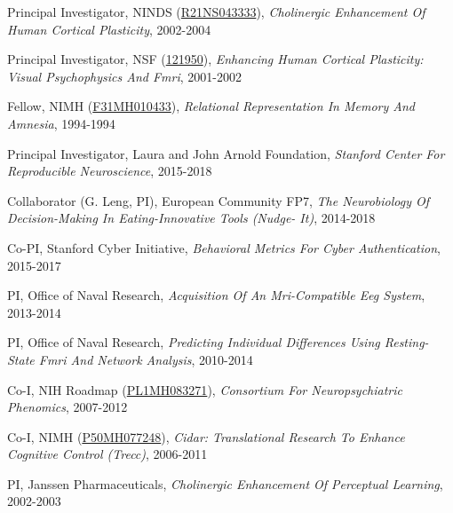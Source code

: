\documentclass[10pt, letterpaper]{article}
\begin{document}
Principal Investigator, NINDS (\href{http://projectreporter.nih.gov/project_info_description.cfm?aid=6623403}{R21NS043333}), \textit{Cholinergic Enhancement Of Human Cortical Plasticity}, 2002-2004 \vspace{2mm}

Principal Investigator, NSF (\href{http://grants.uberresearch.com/100000001/0121950/Enhancing-Human-Cortical-Plasticity-Visual-Psychophysics-and-fMRI}{121950}), \textit{Enhancing Human Cortical Plasticity: Visual Psychophysics And Fmri}, 2001-2002 \vspace{2mm}

Fellow, NIMH (\href{http://projectreporter.nih.gov/project_info_description.cfm?aid=2241597}{F31MH010433}), \textit{Relational Representation In Memory And Amnesia}, 1994-1994 \vspace{2mm}

Principal Investigator, Laura and John Arnold Foundation, \textit{Stanford Center For Reproducible Neuroscience}, 2015-2018 \vspace{2mm}

Collaborator (G. Leng, PI), European Community FP7, \textit{The Neurobiology Of Decision-Making In Eating-Innovative Tools (Nudge- It)}, 2014-2018 \vspace{2mm}

Co-PI, Stanford Cyber Initiative, \textit{Behavioral Metrics For Cyber Authentication}, 2015-2017 \vspace{2mm}

PI, Office of Naval Research, \textit{Acquisition Of An Mri-Compatible Eeg System}, 2013-2014 \vspace{2mm}

PI, Office of Naval Research, \textit{Predicting Individual Differences Using Resting-State Fmri And Network Analysis}, 2010-2014 \vspace{2mm}

Co-I, NIH Roadmap (\href{https://projectreporter.nih.gov/project_info_description.cfm?aid=7650594}{PL1MH083271}), \textit{Consortium For Neuropsychiatric Phenomics}, 2007-2012 \vspace{2mm}

Co-I, NIMH (\href{https://projectreporter.nih.gov/project_info_description.cfm?aid=7480935}{P50MH077248}), \textit{Cidar: Translational Research To Enhance Cognitive Control (Trecc)}, 2006-2011 \vspace{2mm}

PI, Janssen Pharmaceuticals, \textit{Cholinergic Enhancement Of Perceptual Learning}, 2002-2003 \vspace{2mm}
\end{document}
